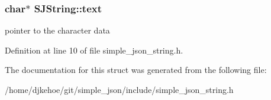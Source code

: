 \subsubsection[{\texorpdfstring{text}{text}}]{\setlength{\rightskip}{0pt plus 5cm}char$\ast$ S\+J\+String\+::text}\hypertarget{structSJString_a623eb7be189beccc29815162623ef0ca}{}\label{structSJString_a623eb7be189beccc29815162623ef0ca}
pointer to the character data 

Definition at line 10 of file simple\+\_\+json\+\_\+string.\+h.



The documentation for this struct was generated from the following file\+:\begin{DoxyCompactItemize}
\item 
/home/djkehoe/git/simple\+\_\+json/include/simple\+\_\+json\+\_\+string.\+h\end{DoxyCompactItemize}
